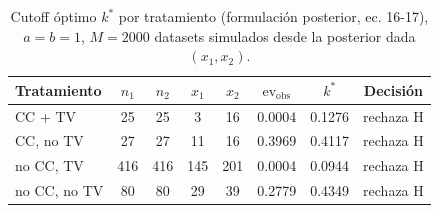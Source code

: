 \begin{table}[!h]
\centering
\caption{Cutoff óptimo $k^{*}$ por tratamiento (formulación posterior, ec. 16-17), $a=b=1$, $M=2000$ datasets simulados desde la posterior dada $(x_1, x_2)$.}
\label{tab:kstar_posterior}
\begin{tabular}{lccccccc}
\toprule
Tratamiento & $n_1$ & $n_2$ & $x_1$ & $x_2$ & $\mathrm{ev}_{\mathrm{obs}}$ & $k^{*}$ & Decisión \\
\midrule
CC + TV & 25 & 25 & 3 & 16 & 0.0004 & 0.1276 & rechaza H \\
CC, no TV & 27 & 27 & 11 & 16 & 0.3969 & 0.4117 & rechaza H \\
no CC, TV & 416 & 416 & 145 & 201 & 0.0004 & 0.0944 & rechaza H \\
no CC, no TV & 80 & 80 & 29 & 39 & 0.2779 & 0.4349 & rechaza H \\
\bottomrule
\end{tabular}
\end{table}
